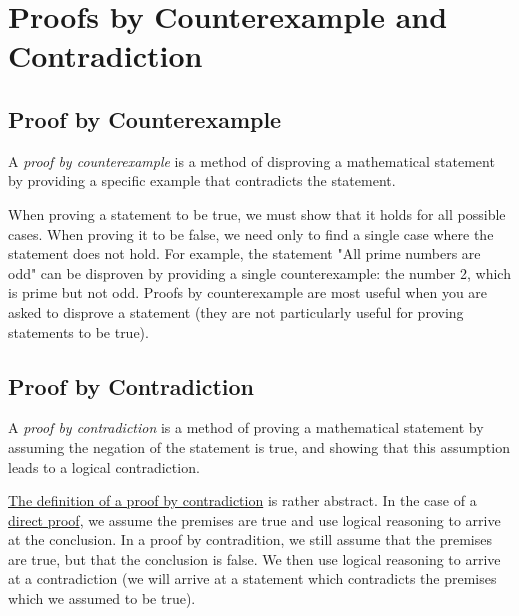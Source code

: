 \chapter{Proofs by Counterexample and Contradiction}
\section{Proof by Counterexample}

\begin{definition}
    A \textit{proof by counterexample} is a method of disproving a mathematical statement by providing a specific example
    that contradicts the statement.
\end{definition}

When proving a statement to be true, we must show that it holds for all possible
cases. When proving it to be false, we need only to find a single case where the statement
does not hold. For example, the statement "All prime numbers are odd" can be disproven
by providing a single counterexample: the number 2, which is prime but not odd. Proofs by
counterexample are most useful when you are asked to disprove a statement (they are not particularly
useful for proving statements to be true).

\section{Proof by Contradiction}

\begin{definition}\label{def:proof-by-contradiction}
    A \textit{proof by contradiction} is a method of proving a mathematical statement by assuming the negation
    of the statement is true, and showing that this assumption leads to a logical contradiction.
\end{definition}

\hyperref[def:proof-by-contradiction]{The definition of a proof by contradiction} is rather abstract. 
In the case of a \hyperref[def:direct-proof]{direct proof}, we assume the premises are true and 
use logical reasoning to arrive at the conclusion. In a proof by contradition, we still assume that the premises
are true, but that the conclusion is false. We then use logical reasoning to arrive at a contradiction (we will
arrive at a statement which contradicts the premises which we assumed to be true).

